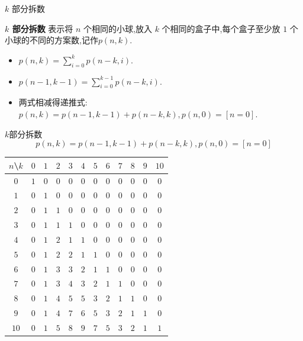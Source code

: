 \documentclass[aspectratio=169]{beamer}  %
\newcommand{\pau}{\pause}
\begin{document}
\begin{frame}[fragile]{$k$ 部分拆数}
    \begin{definition}{\textbf{$k$ 部分拆数}}
        表示将 $n$ 个相同的小球,放入 $k$ 个相同的盒子中,每个盒子至少放 $1$ 个小球的不同的方案数,记作$p(n,k)$.
    \end{definition}
    \begin{itemize}
    	\item $p(n,k)=\sum\limits_{i=0}^kp(n-k,i)$.\pau
    	\item $p(n-1,k-1)=\sum\limits_{i=0}^{k-1}p(n-k,i)$.\pau
    	\item 两式相减得递推式: $p(n,k)=p(n-1,k-1)+p(n-k,k),p(n,0)=[n=0]$.
    \end{itemize}
\end{frame}

\begin{frame}[fragile]{$k$部分拆数}
    $$p(n,k)=p(n-1,k-1)+p(n-k,k),p(n,0)=[n=0]$$
	\begin{center}
		\footnotesize
		\begin{tabular}{c|ccccccccccc}
			$n$\textbackslash$k$&$0$&$1$&$2$&$3$&$4$&$5$&$6$&$7$&$8$&$9$&$10$\\\hline
			$0$&$1$&$0$&$0$&$0$&$0$&$0$&$0$&$0$&$0$&$0$&$0$\\
			$1$&$0$&$1$&$0$&$0$&$0$&$0$&$0$&$0$&$0$&$0$&$0$\\
			$2$&$0$&$1$&$1$&$0$&$0$&$0$&$0$&$0$&$0$&$0$&$0$\\
			$3$&$0$&$1$&$1$&$1$&$0$&$0$&$0$&$0$&$0$&$0$&$0$\\
			$4$&$0$&$1$&$2$&$1$&$1$&$0$&$0$&$0$&$0$&$0$&$0$\\
			$5$&$0$&$1$&$2$&$2$&$1$&$1$&$0$&$0$&$0$&$0$&$0$\\
			$6$&$0$&$1$&$3$&$3$&$2$&$1$&$1$&$0$&$0$&$0$&$0$\\
			$7$&$0$&$1$&$3$&$4$&$3$&$2$&$1$&$1$&$0$&$0$&$0$\\
			$8$&$0$&$1$&$4$&$5$&$5$&$3$&$2$&$1$&$1$&$0$&$0$\\
			$9$&$0$&$1$&$4$&$7$&$6$&$5$&$3$&$2$&$1$&$1$&$0$\\
			$10$&$0$&$1$&$5$&$8$&$9$&$7$&$5$&$3$&$2$&$1$&$1$\\
		\end{tabular}
	\end{center}
\end{frame}
\end{document}
